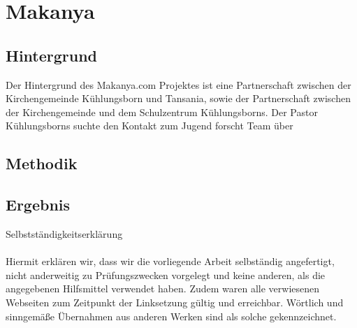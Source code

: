 \documentclass[a4paper,oneside,12pt,titlepage]{article}
\newcommand{\jf}{Jugend forscht }
\begin{document}
\section{Makanya}

\subsection{Hintergrund} %
Der Hintergrund des Makanya.com Projektes ist eine Partnerschaft zwischen der Kirchengemeinde Kühlungsborn und Tansania, sowie der Partnerschaft zwischen der Kirchengemeinde und dem Schulzentrum Kühlungsborns. Der Pastor Kühlungsborns %
suchte den Kontakt zum \jf Team über

\subsection{Methodik} %

\subsection{Ergebnis} %


\newpage
\renewcommand{\refname}{Literatur} 			%
\printbibliography
\small


\newpage
\Large{Selbstständigkeitserklärung}\\
\\
\small Hiermit erklären wir, dass wir die vorliegende Arbeit selbständig angefertigt, nicht anderweitig zu Prüfungszwecken vorgelegt und keine anderen, als die angegebenen Hilfsmittel verwendet haben. Zudem waren alle verwiesenen Webseiten zum Zeitpunkt der Linksetzung gültig und erreichbar. Wörtlich und sinngemäße Übernahmen aus anderen Werken sind als solche gekennzeichnet.
\\
\end{document}
